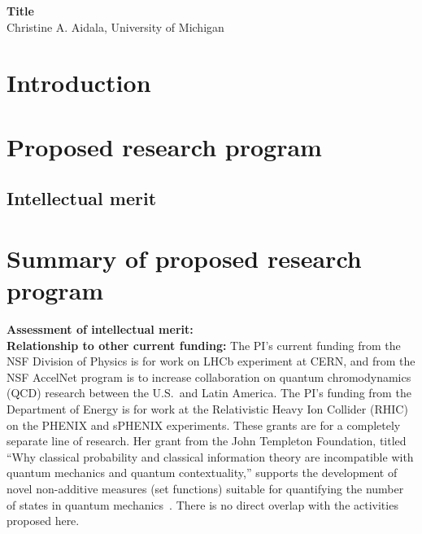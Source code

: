 \begin{center}
	\textbf{Title} \\
	Christine A. Aidala, University of Michigan
\end{center}

\section{Introduction}


\section{Proposed research program}

\subsection{Intellectual merit}



\section{Summary of proposed research program}


\noindent
\textbf{Assessment of intellectual merit:} \\

\noindent
\textbf{Relationship to other current funding:} The PI's current funding from the NSF Division of Physics is for work on LHCb experiment at CERN, and from the NSF AccelNet program is to increase collaboration on quantum chromodynamics (QCD) research between the U.S.~and Latin America.  The PI's funding from the Department of Energy is for work at the Relativistic Heavy Ion Collider (RHIC) on the PHENIX and sPHENIX experiments.  These grants are for a completely separate line of research. Her grant from the John Templeton Foundation, titled ``Why classical probability and classical information theory are incompatible with quantum mechanics and quantum contextuality,'' supports the development of novel non-additive measures (set functions) suitable for quantifying the number of states in quantum mechanics~\cite{aop-nonaddmeas}.  There is no direct overlap with the activities proposed here.  \\

